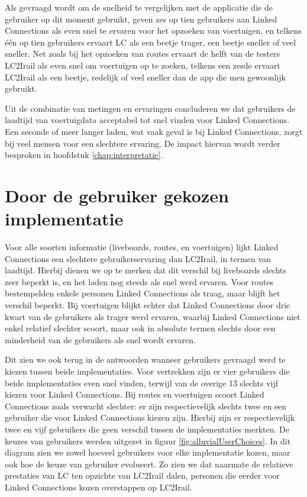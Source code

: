 Als gevraagd wordt om de snelheid te vergelijken met de applicatie die de gebruiker op dit moment gebruikt, geven zes op tien gebruikers aan Linked Connections als even snel te ervaren voor het opzoeken van voertuigen, en telkens één op tien gebruikers ervaart LC als een beetje trager, een beetje sneller of veel sneller. Net zoals bij het opzoeken van routes ervaart de helft van de testers LC2Irail als even snel om voertuigen op te zoeken, telkens een zesde ervaart LC2Irail als een beetje, redelijk of veel sneller dan de app die men gewoonlijk gebruikt.

Uit de combinatie van metingen en ervaringen concluderen we dat gebruikers de laadtijd van voertuigdata acceptabel tot snel vinden voor Linked Connections. Een seconde of meer langer laden, wat vaak geval is bij Linked Connections, zorgt bij veel mensen voor een slechtere ervaring. De impact hiervan wordt verder besproken in hoofdstuk \ref{chap:interpretatie}.

\section{Door de gebruiker gekozen implementatie}

Voor alle soorten informatie (liveboards, routes, en voertuigen) lijkt Linked Connections een slechtere gebruikerservaring dan LC2Irail, in termen van laadtijd. Hierbij dienen we op te merken dat dit verschil bij liveboards slechts zeer beperkt is, en het laden nog steeds als snel werd ervaren. Voor routes bestempelden enkele personen Linked Connections als traag, maar blijft het verschil beperkt. Bij voertuigen blijkt echter dat Linked Connections door drie kwart van de gebruikers als trager werd ervaren, waarbij Linked Connections niet enkel relatief slechter scoort, maar ook in absolute termen slechts door een minderheid van de gebruikers als snel wordt ervaren. 

Dit zien we ook terug in de antwoorden wanneer gebruikers gevraagd werd te kiezen tussen beide implementaties. Voor vertrekken zijn er vier gebruikers die beide implementaties even snel vinden, terwijl van de overige 13 slechts vijf kiezen voor Linked Connections. Bij routes en voertuigen scoort Linked Connections zoals verwacht slechter: er zijn respectievelijk slechts twee en een gebruiker die voor Linked Connections kiezen zijn. Hierbij zijn er respectievelijk twee en vijf gebruikers die geen verschil tussen de implementaties merkten. De keuzes van gebruikers werden uitgezet in figuur \ref{fig:alluvialUserChoices}. In dit diagram zien we zowel hoeveel gebruikers voor elke implementatie kozen, maar ook hoe de keuze van gebruiker evolueert. Zo zien we dat naarmate de relatieve prestaties van LC ten opzichte van LC2Irail dalen, personen die eerder voor Linked Connections kozen overstappen op LC2Irail.

